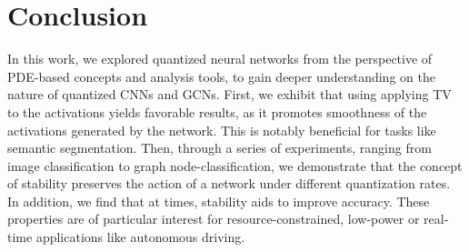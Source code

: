\documentclass[reqno]{amsart}
\begin{document}
\begin{table}
    \centering
    \caption{Comparison of our symmetric PDE-GCN\textsubscript{D} vs the non-symmetric original on node-classification tasks for various data-sets. MSE denotes the similarity of the activations of quantized and full-precision networks. Param. denotes the total number of parameters in each network architecture.}
    \label{tab:pdegcn}
\end{table}

\section{Conclusion}
\label{sec:conclusion}
In this work, we explored quantized neural networks from the perspective of PDE-based concepts and analysis tools, to gain deeper understanding on the nature of quantized CNNs and GCNs. First, we exhibit that using applying TV to the activations yields favorable results, as it promotes smoothness of the activations generated by the network. This is notably beneficial for tasks like semantic segmentation. Then, through a series of experiments, ranging from image classification to graph node-classification, we demonstrate that the concept of stability preserves the action of a network under different quantization rates. In addition, we find that at times, stability aids to improve accuracy. These properties are of particular interest for resource-constrained, low-power or real-time applications like autonomous driving.



\end{document}

